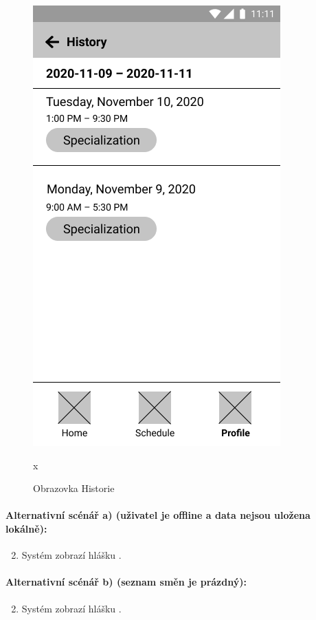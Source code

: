 \documentclass[twoside]{ctuthesis}
\begin{document}
\begin{figure}[h!]
		\includegraphics[scale=.35]{img/history.png}
		\caption{Obrazovka Historie}x
		\label{fig:history}
\end{figure}

\paragraph{Alternativní scénář a) (uživatel je offline a data nejsou uložena lokálně):}
\begin{enumerate}[label=\arabic*a]
	\setcounter{enumi}{1}
	\item Systém zobrazí hlášku .
\end{enumerate}

\paragraph{Alternativní scénář b) (seznam směn je prázdný):}
\begin{enumerate}[label=\arabic*b]
	\setcounter{enumi}{1}
	\item Systém zobrazí hlášku .
\end{enumerate}
\end{document}
